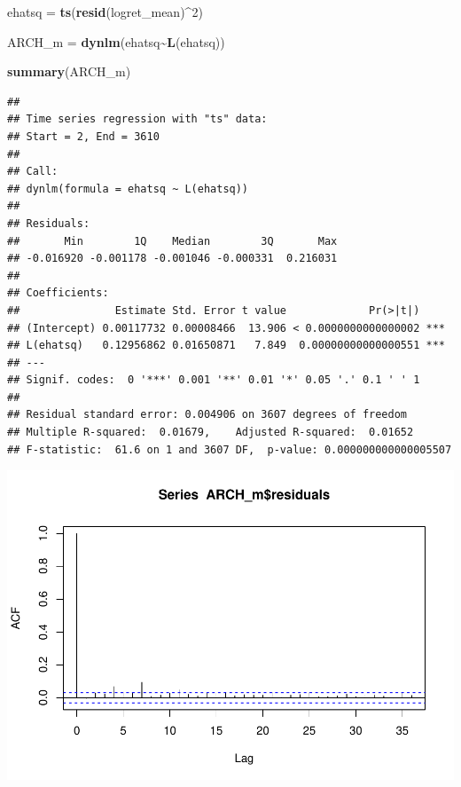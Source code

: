 \documentclass[
]{book}
\newenvironment{Shaded}{\begin{snugshade}}{\end{snugshade}}
\newcommand{\DecValTok}[1]{\textcolor[rgb]{0.00,0.00,0.81}{#1}}
\newcommand{\FunctionTok}[1]{\textcolor[rgb]{0.13,0.29,0.53}{\textbf{#1}}}
\newcommand{\NormalTok}[1]{#1}
\newcommand{\OtherTok}[1]{\textcolor[rgb]{0.56,0.35,0.01}{#1}}
\newcommand{\SpecialCharTok}[1]{\textcolor[rgb]{0.81,0.36,0.00}{\textbf{#1}}}
\begin{document}
\begin{Shaded}
\begin{Highlighting}[]
\NormalTok{ehatsq }\OtherTok{=} \FunctionTok{ts}\NormalTok{(}\FunctionTok{resid}\NormalTok{(logret\_mean)}\SpecialCharTok{\^{}}\DecValTok{2}\NormalTok{)}

\NormalTok{ARCH\_m }\OtherTok{=} \FunctionTok{dynlm}\NormalTok{(ehatsq}\SpecialCharTok{\textasciitilde{}}\FunctionTok{L}\NormalTok{(ehatsq))}

\FunctionTok{summary}\NormalTok{(ARCH\_m)}
\end{Highlighting}
\end{Shaded}

\begin{verbatim}
## 
## Time series regression with "ts" data:
## Start = 2, End = 3610
## 
## Call:
## dynlm(formula = ehatsq ~ L(ehatsq))
## 
## Residuals:
##       Min        1Q    Median        3Q       Max 
## -0.016920 -0.001178 -0.001046 -0.000331  0.216031 
## 
## Coefficients:
##               Estimate Std. Error t value             Pr(>|t|)    
## (Intercept) 0.00117732 0.00008466  13.906 < 0.0000000000000002 ***
## L(ehatsq)   0.12956862 0.01650871   7.849  0.00000000000000551 ***
## ---
## Signif. codes:  0 '***' 0.001 '**' 0.01 '*' 0.05 '.' 0.1 ' ' 1
## 
## Residual standard error: 0.004906 on 3607 degrees of freedom
## Multiple R-squared:  0.01679,    Adjusted R-squared:  0.01652 
## F-statistic:  61.6 on 1 and 3607 DF,  p-value: 0.000000000000005507
\end{verbatim}

\begin{Shaded}
\end{Shaded}

\includegraphics{Notas-Series-Tiempo_files/figure-latex/ArchTest-1.pdf}
\end{document}
